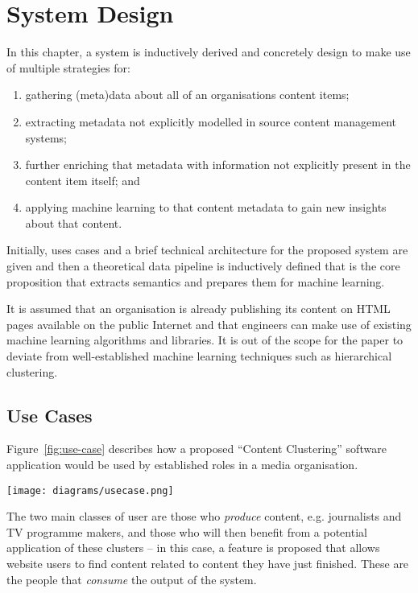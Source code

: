 \chapter{System Design}
\label{chp:design}

In this chapter, a system is inductively derived and concretely design to make
use of multiple strategies for:

\begin{enumerate}
\item gathering (meta)data about all of an organisations content items;
\item extracting metadata not explicitly modelled in source content management
systems;
\item further enriching that metadata with information not explicitly present
in the content item itself; and
\item applying machine learning to that content metadata to gain new insights
about that content.
\end{enumerate}

Initially, uses cases and a brief technical architecture for the
proposed system are given and then a theoretical data pipeline is
inductively defined that is the core proposition that extracts
semantics and prepares them for machine learning.

It is assumed that an organisation is already publishing its content
on HTML pages available on the public Internet and that engineers
can make use of existing machine learning algorithms and libraries. It
is out of the scope for the paper to deviate from well-established
machine learning techniques such as hierarchical clustering.

\section{Use Cases}
\label{sec:usecases}

Figure~\ref{fig:use-case} describes how a proposed ``Content Clustering''
software application would be used by established roles in a media
organisation.

\begin{sidewaysfigure}
  \begin{center}
    \texttt{[image: diagrams/usecase.png]}
  \end{center}
  \caption{Use case diagram for content clustering system\label{fig:use-case}}
\end{sidewaysfigure}

The two main classes of user are those who \emph{produce} content,
e.g. journalists and TV programme makers, and those who will then
benefit from a potential application of these clusters -- in this case,
a feature is proposed that allows website users to find content related
to content they have just finished. These are the people that
\emph{consume} the output of the system.

